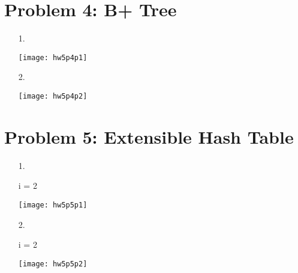 \documentclass[letter,11pt]{article}
\begin{document}
\section*{Problem 4: B+ Tree}

\begin{enumerate}
\item[1.]

  \texttt{[image: hw5p4p1]}

\item[2.]

  \texttt{[image: hw5p4p2]}

\end{enumerate}

\section*{Problem 5: Extensible Hash Table}

\begin{enumerate}
\item[1.]

i = 2

\texttt{[image: hw5p5p1]}

\item[2.]

i = 2

\texttt{[image: hw5p5p2]}

\end{enumerate}
\end{document}
